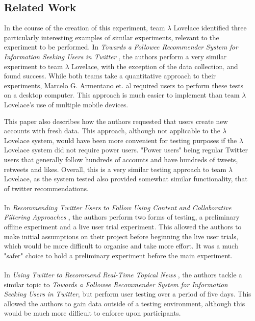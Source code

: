 \documentclass{article}
\begin{document}
\subsection{Related Work}
In the course of the creation of this experiment, team $\lambda$ Lovelace identified three particularly interesting examples of similar experiments, relevant to the experiment to be performed. In \textit{Towards a Followee Recommender System for Information Seeking Users in Twitter} \cite{paper1}, the authors perform a very similar experiment to team $\lambda$ Lovelace, with the exception of the data collection, and found success. While both teams take a quantitative approach to their experiments, Marcelo G. Armentano et. al required users to perform these tests on a desktop computer. This approach is much easier to implement than team $\lambda$ Lovelace's use of multiple mobile devices. 

This paper also describes how the authors requested that users create new accounts with fresh data. This approach, although not applicable to the $\lambda$ Lovelace system, would have been more convenient for testing purposes if the $\lambda$ Lovelace system did not require power users. "Power users" being regular Twitter users that generally follow hundreds of accounts and have hundreds of tweets, retweets and likes. Overall, this is a very similar testing approach to team $\lambda$ Lovelace, as the system tested also provided somewhat similar functionality, that of twitter recommendations.
\\\\
In \textit{Recommending Twitter Users to Follow Using Content and
Collaborative Filtering Approaches} \cite{paper2}, the authors perform two forms of testing, a preliminary offline experiment and a live user trial experiment. This allowed the authors to make initial assumptions on their project before beginning the live user trials, which would be more difficult to organise and take more effort. It was a much "safer" choice to hold a preliminary experiment before the main experiment.
\\\\
In \textit{Using Twitter to Recommend Real-Time Topical News} \cite{paper3}, the authors tackle a similar topic to \textit{Towards a Followee Recommender System for Information Seeking Users in Twitter}, but perform user testing over a period of five days. This allowed the authors to gain data outside of a testing environment, although this would be much more difficult to enforce upon participants.
\end{document}
